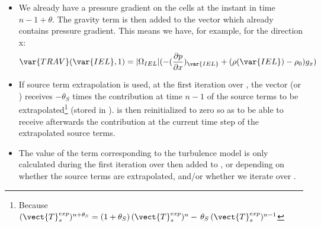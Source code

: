 \begin{itemize}
\item We already have a pressure gradient on the cells at the instant in time $n-1+\theta$. The gravity term is then added to the vector  which already contains pressure gradient. This means we have, for example, for the direction x:
\begin{equation}
\var{TRAV}(\var{IEL},1) = |\Omega_{IEL}| (-\displaystyle (\frac {\partial p}
{\partial x})_{\var{IEL}}+(\rho(\var{IEL})-\rho_0)g_x)
\end{equation}

\item If source term extrapolation is used, at the first iteration over , the vector  (or ) receives $-\theta_S$ times the contribution at time $n-1$ of the source terms to be extrapolated\footnote{Because
$(\vect{T}_s^{exp})^{n+\theta_S}=(1+\theta_S)\,(\vect{T}_s^{exp})^n
-\,\theta_S\, (\vect{T}_s^{exp})^{n-1}$} (stored in ).  is then reinitialized to zero so as to be able to receive afterwards the contribution at the current time step of the extrapolated source terms.

\item The value of the term corresponding to the turbulence model is only calculated during the first iteration over  then added to ,  or  depending on whether the source terms are extrapolated, and/or whether we iterate over .\\


\end{itemize}

